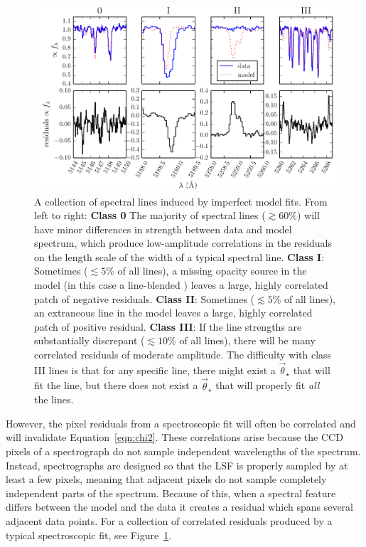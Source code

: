 \documentclass[preprint]{aastex} %
\newcommand{\vt}{\vec{\theta}}
\newcommand{\vstar}{\vt_{\star}}
\begin{document}
\begin{figure}[!htb]
\begin{center}
  \includegraphics{figs/badlines.pdf}
  \caption{A collection of spectral lines induced by imperfect model fits.
    From left to right: \textbf{Class 0} The majority of spectral lines
    ($\gtrsim 60$\%) will have minor differences in strength between data and
    model spectrum, which produce low-amplitude correlations in the residuals
    on the length scale of the width of a typical spectral line.  \textbf{Class
    I}: Sometimes ($\lesssim 5$\% of all lines), a missing opacity source in
    the model (in this case a line-blended ) leaves a large, highly correlated
    patch of negative residuals.  \textbf{Class II}: Sometimes ($\lesssim 5$\%
    of all lines), an extraneous line in the model leaves a large, highly
    correlated patch of positive residual.  \textbf{Class III}: If the line strengths are
    substantially discrepant ($\lesssim 10$\% of all lines), there will be many
    correlated residuals of moderate amplitude.  The difficulty
    with class III lines is that for any specific line, there might exist a
    $\vstar$ that will fit the line, but there does not exist a $\vstar$ that
    will properly fit \emph{all} the lines.}
\label{fig:badlines}
\end{center}
\end{figure}

However, the pixel residuals from a spectroscopic fit will often be correlated and will invalidate Equation~\ref{eqn:chi2}. These correlations arise because the CCD pixels of a spectrograph do not sample independent wavelengths of the spectrum. Instead, spectrographs are designed so that the LSF is properly sampled by at least a few pixels, meaning that adjacent pixels do not sample completely independent parts of the spectrum. Because of this, when a spectral feature differs between the model and the data it creates a residual which spans several adjacent data points. For a collection of correlated residuals produced by a typical spectroscopic fit, see Figure~\ref{fig:badlines}. 
\end{document}
